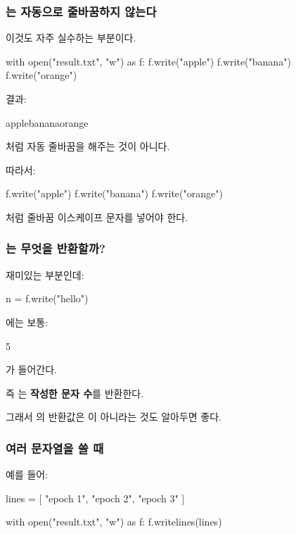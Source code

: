 \subsubsection{는 자동으로 줄바꿈하지 않는다}

이것도 자주 실수하는 부분이다.

\begin{dhkcode}
with open("result.txt", "w") as f:
    f.write("apple")
    f.write("banana")
    f.write("orange")
\end{dhkcode}

결과:

\begin{dhkzsh}
applebananaorange
\end{dhkzsh}

처럼 자동 줄바꿈을 해주는 것이 아니다.

따라서:

\begin{dhkcode}
f.write("apple\n")
f.write("banana\n")
f.write("orange\n")
\end{dhkcode}

처럼 줄바꿈 이스케이프 문자를 넣어야 한다.

\subsubsection{는 무엇을 반환할까?}

재미있는 부분인데:

\begin{dhkcode}
n = f.write("hello")
\end{dhkcode}

에는 보통:

\begin{dhkzsh}
5
\end{dhkzsh}

가 들어간다.

즉 는 \textbf{작성한 문자 수}를 반환한다.

그래서 의 반환값은 이 아니라는 것도 알아두면 좋다.

\subsubsection{여러 문자열을 쓸 때 }

예를 들어:

\begin{dhkcode}
lines = [
    "epoch 1\n",
    "epoch 2\n",
    "epoch 3\n"
]

with open("result.txt", "w") as f:
    f.writelines(lines)
\end{dhkcode}

